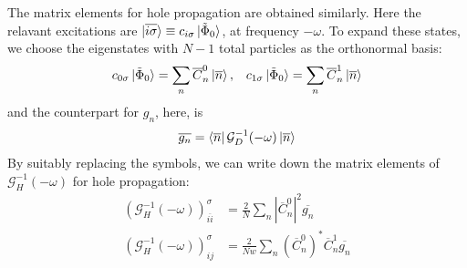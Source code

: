 \documentclass{article}
\numberwithin{equation}{section}
\begin{document}
The matrix elements for hole propagation are obtained similarly. Here the relavant excitations are $\ket{\overline{i\sigma}} \equiv c_{i\sigma}\ket{\tilde \Phi_0}$, at frequency $-\omega$. To expand these states, we choose the eigenstates with $N-1$ total particles as the orthonormal basis:
\begin{equation}\begin{aligned}
	c_{0\sigma}\ket{\tilde \Phi_0} = \sum_n \overline C^0_n \ket{\overline{n}}, && c_{1\sigma}\ket{\tilde \Phi_0} = \sum_n \overline C^1_n \ket{\overline{n}}%
\end{aligned}\end{equation}
and the counterpart for $g_n$, here, is
\begin{equation}\begin{aligned}
	\overline {g_n} = \bra{\overline n}\mathcal{G}_{D}^{-1}(-\omega)\ket{\overline n}
\end{aligned}\end{equation}
By suitably replacing the symbols, we can write down the matrix elements of $\mathcal{G}_H^{-1}(-\omega)$ for hole propagation:
\begin{equation}\begin{aligned}
	\left(\mathcal{G}_{H}^{-1}(-\omega)\right)_{\overline{ii}}^\sigma &= \frac{2}{N}\sum_{n} |\overline C^0_{n}|^2 \overline{g_n}\\
	\left(\mathcal{G}_{H}^{-1}(-\omega)\right)_{ij}^\sigma &= \frac{2}{Nw}\sum_{n} \left(\overline C^0_{n}\right)^* \overline C^1_{n} \overline{g_n} 
\end{aligned}\end{equation}


\end{document}
